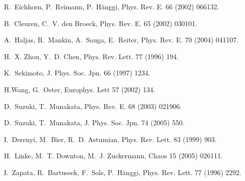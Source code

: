\documentclass{elsart}
\begin{document}
\begin{thebibliography}{99}
R.~Eichhorn, P.~Reimann, P.~H\"anggi, Phys. Rev. E. 66 (2002) 066132.

B.~Cleuren, C.~V. den Broeck, Phys. Rev. E. 65 (2002) 030101.

A.~Haljas, R.~Mankin, A.~Sauga, E.~Reiter, Phys. Rev. E. 70 (2004) 041107.

H.~X. Zhou, Y.~D. Chen, Phys. Rev. Lett. 77 (1996) 194.

K.~Sekimoto, J. Phys. Soc. Jpn. 66 (1997) 1234.

H.Wang, G.~Oster, Europhys. Lett 57 (2002) 134.

D.~Suzuki, T.~Munakata, Phys. Rev. E. 68 (2003) 021906.

D.~Suzuki, T.~Munakata, J. Phys. Soc. Jpn. 74 (2005) 550.

I.~Derenyi, M.~Bier, R.~D. Astumian, Phys. Rev. Lett. 83 (1999) 903.

H.~Linke, M.~T. Downton, M.~J. Zuckermann, Chaos 15 (2005) 026111.

I.~Zapata, R.~Bartussek, F.~Sols, P.~H\"anggi, Phys. Rev. Lett. 77 (1996) 2292.


\end{thebibliography}
\end{document}
